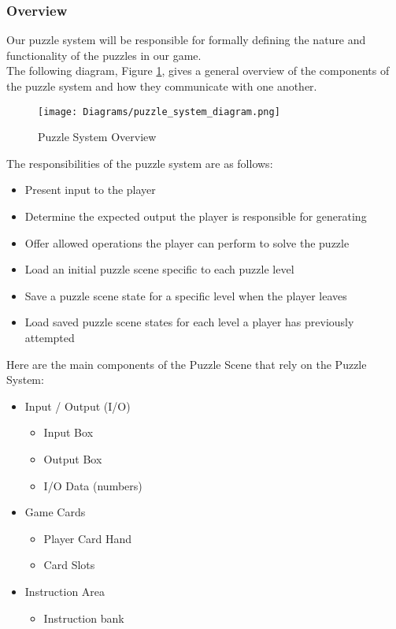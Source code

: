 \subsubsection{Overview}
Our puzzle system will be responsible for formally defining the nature and
functionality of the puzzles in our game.\\

The following diagram, Figure \ref{fig:puzzle_system_diagram}, gives a general overview
of the components of the puzzle system and how they communicate with one another.

\begin{figure}[!hb]
  \caption{Puzzle System Overview}
  \label{fig:puzzle_system_diagram}
  \centering
  \texttt{[image: Diagrams/puzzle\_system\_diagram.png]}
\end{figure}
\vfill
\clearpage

The responsibilities of the puzzle system are as follows:

\begin{itemize}
	\item Present input to the player
	\item Determine the expected output the player is responsible for generating
	\item Offer allowed operations the player can perform to solve the puzzle
	\item Load an initial puzzle scene specific to each puzzle level
	\item Save a puzzle scene state for a specific level when the player leaves
	\item Load saved puzzle scene states for each level a player has previously attempted
\end{itemize}

Here are the main components of the Puzzle Scene that rely on the Puzzle System:

\begin{itemize}
	\item Input / Output (I/O)
	\begin{itemize}
		\item Input Box
		\item Output Box
		\item I/O Data (numbers)
	\end{itemize}

	\item Game Cards
	\begin{itemize}
		\item Player Card Hand
		\item Card Slots
	\end{itemize}

	\item Instruction Area
	\begin{itemize}
		\item Instruction bank
	\end{itemize}
\end{itemize}

